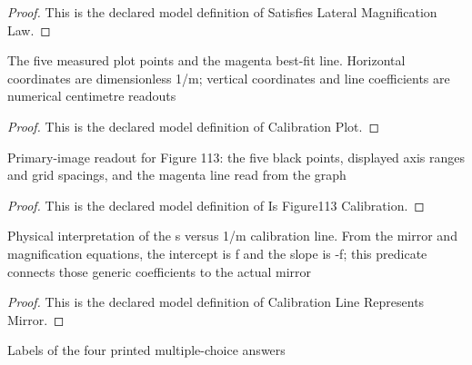\begin{proof}
  This is the declared model definition of Satisfies Lateral Magnification Law.
\end{proof}
\begin{definition}
  \label{def:physics:phyx-mini-0113:phyxminiproblems-problemphyxmini0113-calibrationplot}
  The five measured plot points and the magenta best-fit line. Horizontal coordinates are dimensionless 1/m; vertical coordinates and line coefficients are numerical centimetre readouts
\end{definition}
\begin{proof}
  This is the declared model definition of Calibration Plot.
\end{proof}
\begin{definition}
  \label{def:physics:phyx-mini-0113:phyxminiproblems-problemphyxmini0113-isfigure113calibration}
  Primary-image readout for Figure 113: the five black points, displayed axis ranges and grid spacings, and the magenta line read from the graph
\end{definition}
\begin{proof}
  This is the declared model definition of Is Figure113 Calibration.
\end{proof}
\begin{definition}
  \label{def:physics:phyx-mini-0113:phyxminiproblems-problemphyxmini0113-calibrationlinerepresentsmirror}
  Physical interpretation of the s versus 1/m calibration line. From the mirror and magnification equations, the intercept is f and the slope is -f; this predicate connects those generic coefficients to the actual mirror
\end{definition}
\begin{proof}
  This is the declared model definition of Calibration Line Represents Mirror.
\end{proof}
\begin{definition}
  \label{def:physics:phyx-mini-0113:phyxminiproblems-problemphyxmini0113-answerchoice}
  Labels of the four printed multiple-choice answers
\end{definition}
